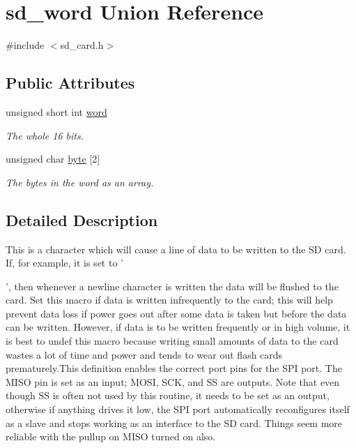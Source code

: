 \hypertarget{unionsd__word}{\section{sd\-\_\-word Union Reference}
\label{unionsd__word}
}


{\ttfamily \#include $<$sd\-\_\-card.\-h$>$}

\subsection*{Public Attributes}
\begin{DoxyCompactItemize}
\item 
\hypertarget{unionsd__word_a37ba33e7e3e76e030121f52a01f273e0}{unsigned short int \hyperlink{unionsd__word_a37ba33e7e3e76e030121f52a01f273e0}{word}}\label{unionsd__word_a37ba33e7e3e76e030121f52a01f273e0}

\begin{DoxyCompactList}\small\item\em The whole 16 bits. \end{DoxyCompactList}\item 
\hypertarget{unionsd__word_acc3a05788a859346e6768310165065cd}{unsigned char \hyperlink{unionsd__word_acc3a05788a859346e6768310165065cd}{byte} \mbox{[}2\mbox{]}}\label{unionsd__word_acc3a05788a859346e6768310165065cd}

\begin{DoxyCompactList}\small\item\em The bytes in the word as an array. \end{DoxyCompactList}\end{DoxyCompactItemize}


\subsection{Detailed Description}
This is a character which will cause a line of data to be written to the S\-D card. If, for example, it is set to '\par
', then whenever a newline character is written the data will be flushed to the card. Set this macro if data is written infrequently to the card; this will help prevent data loss if power goes out after some data is taken but before the data can be written. However, if data is to be written frequently or in high volume, it is best to undef this macro because writing small amounts of data to the card wastes a lot of time and power and tends to wear out flash cards prematurely.\-This definition enables the correct port pins for the S\-P\-I port. The M\-I\-S\-O pin is set as an input; M\-O\-S\-I, S\-C\-K, and S\-S are outputs. Note that even though S\-S is often not used by this routine, it needs to be set as an output, otherwise if anything drives it low, the S\-P\-I port automatically reconfigures itself as a slave and stops working as an interface to the S\-D card. Things seem more reliable with the pullup on M\-I\-S\-O turned on also.

